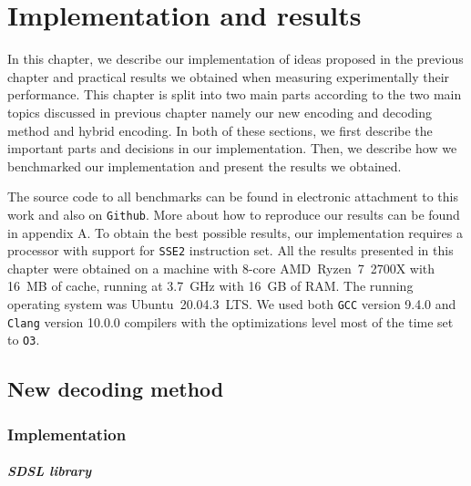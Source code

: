 \chapter{Implementation and results}
\label{kap:kap4}

In this chapter, we describe our implementation of ideas proposed in the previous chapter
and practical results we obtained when measuring experimentally their performance.
This chapter is split into two main parts according to the two main topics discussed
in previous chapter namely our new encoding and decoding method and hybrid encoding.
In both of these sections, we first describe the important parts and decisions in our
implementation. Then, we describe how we benchmarked our implementation and present
the results we obtained.

The source code to all benchmarks can be found in electronic attachment to this work
and also on \texttt{Github}. More about how to reproduce our results can be found in
appendix A. To obtain the best possible results, our implementation requires
a processor with support for \texttt{SSE2} instruction set. All the results presented
in this chapter were obtained on a machine with 8-core AMD~Ryzen~7~2700X with 16~MB of
cache, running at 3.7~GHz with 16~GB of RAM. The running operating system was Ubuntu~20.04.3~LTS.
We used both \texttt{GCC} version 9.4.0 and \texttt{Clang} version 10.0.0 compilers with
the optimizations level most of the time set to \texttt{O3}.

\section{New decoding method}

\subsection{Implementation}

\paragraph{SDSL library}

